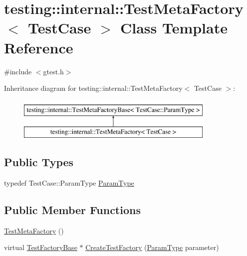\hypertarget{classtesting_1_1internal_1_1_test_meta_factory}{\section{testing\-:\-:internal\-:\-:Test\-Meta\-Factory$<$ Test\-Case $>$ Class Template Reference}
\label{classtesting_1_1internal_1_1_test_meta_factory}
}


{\ttfamily \#include $<$gtest.\-h$>$}

Inheritance diagram for testing\-:\-:internal\-:\-:Test\-Meta\-Factory$<$ Test\-Case $>$\-:\begin{figure}[H]
\begin{center}
\leavevmode
\includegraphics[height=2.000000cm]{classtesting_1_1internal_1_1_test_meta_factory}
\end{center}
\end{figure}
\subsection*{Public Types}
\begin{DoxyCompactItemize}
\item 
typedef Test\-Case\-::\-Param\-Type \hyperlink{classtesting_1_1internal_1_1_test_meta_factory_a9c12e442b4389381b948ed669fcf0f84}{Param\-Type}
\end{DoxyCompactItemize}
\subsection*{Public Member Functions}
\begin{DoxyCompactItemize}
\item 
\hyperlink{classtesting_1_1internal_1_1_test_meta_factory_a3eadbf9867b702bcba130a3113a77b71}{Test\-Meta\-Factory} ()
\item 
virtual \hyperlink{classtesting_1_1internal_1_1_test_factory_base}{Test\-Factory\-Base} $\ast$ \hyperlink{classtesting_1_1internal_1_1_test_meta_factory_ae9f5334c68af309bca8f7ec29d837e38}{Create\-Test\-Factory} (\hyperlink{classtesting_1_1internal_1_1_test_meta_factory_a9c12e442b4389381b948ed669fcf0f84}{Param\-Type} parameter)
\end{DoxyCompactItemize}


